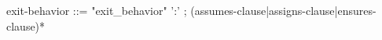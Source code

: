 \begin{syntax}
exit-behavior ::= {"exit_behavior" ':'} ;
{(assumes-clause|assigns-clause|ensures-clause)*}
\end{syntax}
